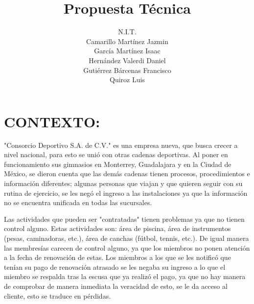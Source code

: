 \documentclass[12pt,letterpaper]{article}
\title{Propuesta Técnica}
\author{N.I.T.\\
Camarillo Martínez Jazmin\\
García Martínez Isaac\\
Hernández Valerdi Daniel\\
Gutiérrez Bárcenas Francisco\\
Quiroz Luis}
\begin{document}
\maketitle

\newpage 
\tableofcontents
\newpage 
\section{CONTEXTO:}
"Consorcio Deportivo S.A. de C.V."  es una empresa nueva, que busca crecer a nivel nacional, para esto se unió con otras cadenas deportivas. Al poner en funcionamiento sus gimnasios en Monterrey, Guadalajara y en la Ciudad de México, se dieron cuenta que las demás cadenas tienen procesos, procedimientos e información diferentes; algunas personas que viajan y que quieren seguir con su rutina de ejercicio, se les negó el ingreso a las instalaciones ya que la información no se encuentra unificada en todas las sucursales.

Las actividades que pueden ser "contratadas" tienen problemas ya que no tienen control alguno. Estas actividades son: área de piscina, área de instrumentos (pesas, caminadoras, etc.), área de canchas (fútbol, tennis, etc.).  De igual manera las membresías carecen de control alguno, ya que los miembros no ponen atención a la fecha de renovación de estas. Los miembros a los que se les notificó que tenían su pago de renovación atrasado se les negaba su ingreso a lo que el miembro se respalda tras la escusa que ya realizó el pago, ya que no hay manera de comprobar de manera inmediata la veracidad de esto, se le da acceso al cliente, esto se traduce en pérdidas.
\end{document}

